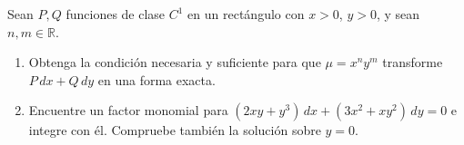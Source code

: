Sean $P,Q$ funciones de clase $C^1$ en un rectángulo con $x>0$, $y>0$, y sean $n,m\in\mathbb R$.

\begin{enumerate}[label=(\alph*),ref=\alph*,leftmargin=*]
\item Obtenga la condición necesaria y suficiente para que $\mu=x^ny^m$ transforme $P\,dx+Q\,dy$ en una forma exacta.
\item Encuentre un factor monomial para $(2xy+y^3)\,dx+(3x^2+xy^2)\,dy=0$ e integre con él. Compruebe también la solución sobre $y=0$.
\end{enumerate}
